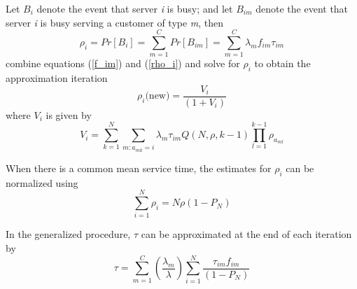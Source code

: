 \begin{frame}
  Let $B_i$ denote
  the event that server \textit{i} is busy;
  and let $B_{im}$
  denote the event that server \textit{i}
  is busy serving a customer of type \textit{m}, 
  then
  \begin{equation} \label{rho_i}
    \rho_{i} =
    Pr\left[B_i\right] =
    \sum_{m=1}^{C}{
      Pr\left[B_{im}\right]
    } =
    \sum_{m=1}^{C}{
      \lambda_{m}f_{im}\tau_{im}
    }
  \end{equation}
  combine equations (\ref{f_im}) and (\ref{rho_i})
  and solve for $\rho_i$ to obtain the approximation iteration
  \begin{equation}
    \rho_i\mbox{(new)}=\frac{V_i}{(1+V_i)}
  \end{equation}
  where $V_i$ is given by
  \begin{equation} \label{V_i}
    V_i = 
    \sum_{k=1}^{N}{
      \sum_{m:a_{mk}=i}{
        \lambda_m \tau_{im} Q(N,\rho,k-1)\prod_{l=1}^{k-1}{\rho_{a_{ml}}}
      }
    }
  \end{equation}
\end{frame}

\begin{frame}
  When there is a common mean service time,
  the estimates for $\rho_i$ can be normalized using
  \begin{equation} \label{P_N}
    \sum_{i=1}^{N}{\rho_i} = N \rho (1 - P_{N})
  \end{equation}

  In the generalized procedure,
  $\tau$ can be approximated
  at the end of each iteration by
  \begin{equation} \label{tau}
    \tau = 
    \sum_{m=1}^{C}{
      \left(
      \frac{\lambda_m}
           {\lambda}
      \right)
      \sum_{i=1}^{N}{
        \frac{\tau_{im}f_{im}}
             {(1-P_N)}
      }
    }
  \end{equation}
\end{frame}

